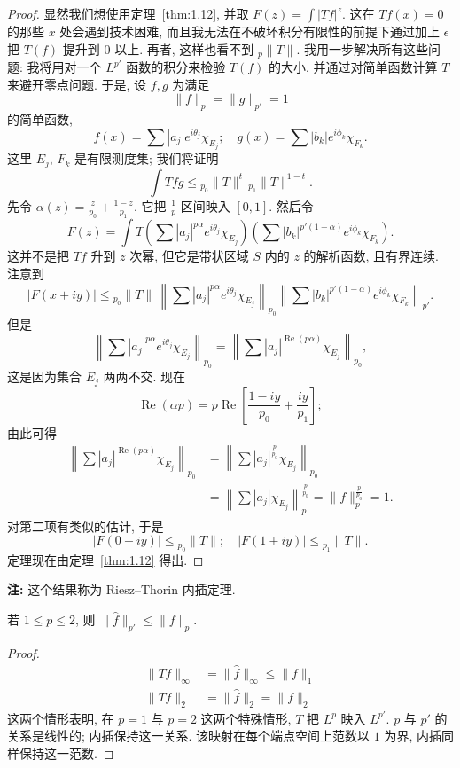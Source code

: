 \begin{proof}
显然我们想使用定理~\ref{thm:1.12}, 并取 $F(z)=\int|Tf|^z$. 这在 $Tf(x)=0$ 的那些 $x$ 处会遇到技术困难, 而且我无法在不破坏积分有限性的前提下通过加上 $\epsilon$ 把 $T(f)$ 提升到 $0$ 以上. 再者, 这样也看不到 ${}_p\|T\|$. 我用一步解决所有这些问题: 我将用对一个 $L^{p'}$ 函数的积分来检验 $T(f)$ 的大小, 并通过对简单函数计算 $T$ 来避开零点问题. 于是, 设 $f,g$ 为满足
\[
\|f\|_p=\|g\|_{p'}=1
\]
的简单函数,
\[
f(x)=\sum|a_j|e^{i\theta_j}\chi_{E_j};\quad g(x)=\sum|b_k|e^{i\phi_k}\chi_{F_k}.
\]
这里 $E_j$, $F_k$ 是有限测度集; 我们将证明
\[
\int Tfg\leq{}_{p_0}\|T\|^{t}\,{}_{p_1}\|T\|^{1-t}.
\]
先令 $\alpha(z)=\frac{z}{p_0}+\frac{1-z}{p_1}$. 它把 $\frac{1}{p}$ 区间映入 $[0,1]$. 然后令
\[
F(z)=\int T\left(\sum|a_j|^{p\alpha}e^{i\theta_j}\chi_{E_j}\right)\left(\sum|b_k|^{p'(1-\alpha)}e^{i\phi_k}\chi_{F_k}\right).
\]
这并不是把 $Tf$ 升到 $z$ 次幂, 但它是带状区域 $S$ 内的 $z$ 的解析函数, 且有界连续. 注意到
\[
|F(x+iy)|\leq{}_{p_0}\|T\|\,\left\|\sum|a_j|^{p\alpha}e^{i\theta_j}\chi_{E_j}\right\|_{p_0}\left\|\sum|b_k|^{p'(1-\alpha)}e^{i\phi_k}\chi_{F_k}\right\|_{p'}.
\]
但是
\[
\left\|\sum|a_j|^{p\alpha}e^{i\theta_j}\chi_{E_j}\right\|_{p_0}
=\left\|\sum|a_j|^{\operatorname{Re}(p\alpha)}\chi_{E_j}\right\|_{p_0},
\]
这是因为集合 $E_j$ 两两不交. 现在
\[
\operatorname{Re}(\alpha p)=p\operatorname{Re}\left[\frac{1-iy}{p_0}+\frac{iy}{p_1}\right];
\]
由此可得
\begin{align*}
\left\|\sum|a_j|^{\operatorname{Re}(p\alpha)}\chi_{E_j}\right\|_{p_0}
&=\left\|\sum|a_j|^{\frac{p}{p_0}}\chi_{E_j}\right\|_{p_0} \\
&=\left\|\sum|a_j|\chi_{E_j}\right\|_p^{\frac{p}{p_0}}=\|f\|_p^{\frac{p}{p_0}}=1.
\end{align*}
对第二项有类似的估计, 于是
\[
|F(0+iy)|\leq{}_{p_0}\|T\|;\quad |F(1+iy)|\leq{}_{p_1}\|T\|.
\]
定理现在由定理~\ref{thm:1.12} 得出.
\end{proof}

\noindent\textbf{注:} 这个结果称为 Riesz--Thorin 内插定理.

\begin{theorem}\label{thm:1.14}
若 $1\leq p\leq 2$, 则 $\|\hat{f}\|_{p'}\leq\|f\|_p$.
\end{theorem}

\begin{proof}
\begin{align*}
\|Tf\|_{\infty}&=\|\hat{f}\|_{\infty}\leq\|f\|_1 \\
\|Tf\|_2&=\|\hat{f}\|_2=\|f\|_2
\end{align*}
这两个情形表明, 在 $p=1$ 与 $p=2$ 这两个特殊情形, $T$ 把 $L^p$ 映入 $L^{p'}$. $p$ 与 $p'$ 的关系是线性的; 内插保持这一关系. 该映射在每个端点空间上范数以 $1$ 为界, 内插同样保持这一范数.
\end{proof}

